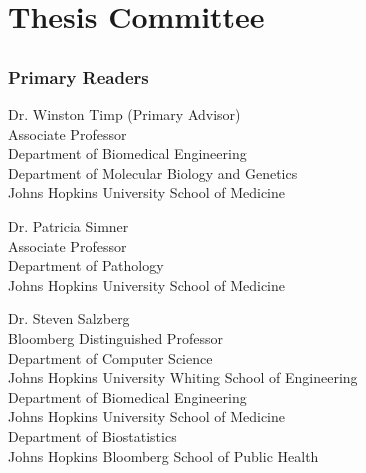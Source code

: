\chapter*{Thesis Committee}

\section*{}
\subsection*{Primary Readers}

\begin{singlespace}


\indent Dr. Winston Timp (Primary Advisor)\\
\indent \indent Associate Professor \\
\indent \indent Department of Biomedical Engineering \\
\indent \indent Department of Molecular Biology and Genetics \\
\indent \indent Johns Hopkins University School of Medicine \\



\smallskip

\noindent Dr. Patricia Simner \\
\indent \indent Associate Professor \\
\indent \indent Department of Pathology \\
\indent \indent Johns Hopkins University School of Medicine \\


\smallskip

\noindent Dr. Steven Salzberg \\
\indent \indent Bloomberg Distinguished Professor \\
\indent \indent Department of Computer Science \\
\indent \indent Johns Hopkins University Whiting School of Engineering \\
\indent \indent Department of Biomedical Engineering \\
\indent \indent Johns Hopkins University School of Medicine \\
\indent \indent Department of Biostatistics \\
\indent \indent Johns Hopkins Bloomberg School of Public Health \\



\end{singlespace}


